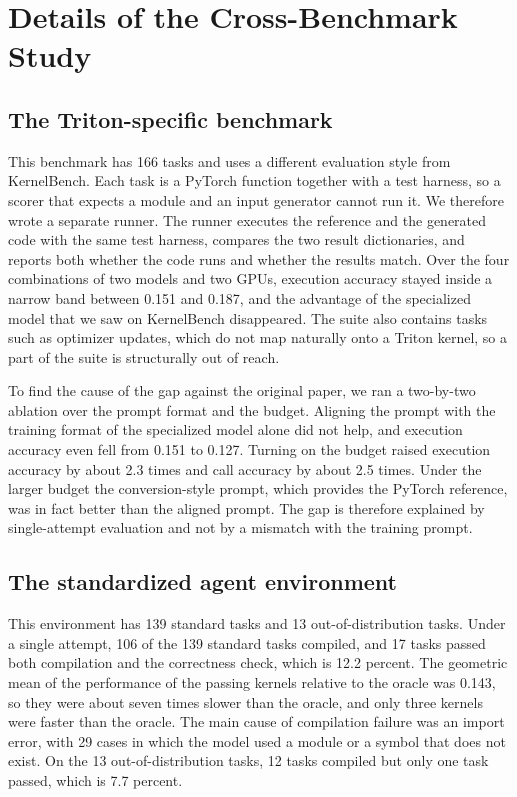 \section{Details of the Cross-Benchmark Study}

\subsection{The Triton-specific benchmark}
This benchmark has 166 tasks and uses a different evaluation style from KernelBench. Each task is a
PyTorch function together with a test harness, so a scorer that expects a module and an input
generator cannot run it. We therefore wrote a separate runner. The runner executes the reference and
the generated code with the same test harness, compares the two result dictionaries, and reports
both whether the code runs and whether the results match. Over the four combinations of two models
and two GPUs, execution accuracy stayed inside a narrow band between 0.151 and 0.187, and the
advantage of the specialized model that we saw on KernelBench disappeared. The suite also contains
tasks such as optimizer updates, which do not map naturally onto a Triton kernel, so a part of the
suite is structurally out of reach.

To find the cause of the gap against the original paper, we ran a two-by-two ablation over the prompt
format and the budget. Aligning the prompt with the training format of the specialized model alone
did not help, and execution accuracy even fell from 0.151 to 0.127. Turning on the budget raised
execution accuracy by about 2.3 times and call accuracy by about 2.5 times. Under the larger budget
the conversion-style prompt, which provides the PyTorch reference, was in fact better than the
aligned prompt. The gap is therefore explained by single-attempt evaluation and not by a mismatch
with the training prompt.

\subsection{The standardized agent environment}
This environment has 139 standard tasks and 13 out-of-distribution tasks. Under a single attempt,
106 of the 139 standard tasks compiled, and 17 tasks passed both compilation and the correctness
check, which is 12.2 percent. The geometric mean of the performance of the passing kernels relative
to the oracle was 0.143, so they were about seven times slower than the oracle, and only three
kernels were faster than the oracle. The main cause of compilation failure was an import error, with
29 cases in which the model used a module or a symbol that does not exist. On the 13
out-of-distribution tasks, 12 tasks compiled but only one task passed, which is 7.7 percent.

